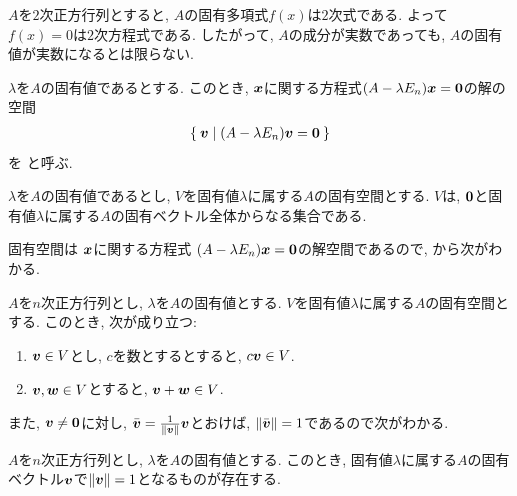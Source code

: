 \begin{remark}
  $A$を$2$次正方行列とすると, $A$の固有多項式$f(x)$は$2$次式である.
  よって$f(x)=0$は$2$次方程式である.
  したがって, $A$の成分が実数であっても,
  $A$の固有値が実数になるとは限らない.
\end{remark}

\begin{definition}
  $\lambda$を$A$の固有値であるとする.
  このとき,
  $\boldsymbol{x}$に関する方程式$(A-\lambda E_n)\boldsymbol{x}=\boldsymbol{0}$の解の空間
  \begin{align*}
    \Set{\boldsymbol{v}| (A-\lambda E_n)\boldsymbol{v}=\boldsymbol{0}}
  \end{align*}
  を
 と呼ぶ.
\end{definition}
\begin{remark}
  $\lambda$を$A$の固有値であるとし,
  $V$を固有値$\lambda$に属する$A$の固有空間とする.
  $V$は,
  $\boldsymbol{0}$と固有値$\lambda$に属する$A$の固有ベクトル全体からなる集合である.
\end{remark}
固有空間は
$\boldsymbol{x}$に関する方程式
$(A-\lambda E_n)\boldsymbol{x}=\boldsymbol{0}$の解空間であるので,
から次がわかる.
\begin{prop}
  $A$を$n$次正方行列とし,
  $\lambda$を$A$の固有値とする.
  $V$を固有値$\lambda$に属する$A$の固有空間とする.
  このとき, 次が成り立つ:
  \begin{enumerate}
  \item $\boldsymbol{v}\in V$とし, $c$を数とするとすると, $c\boldsymbol{v}\in V$.
  \item $\boldsymbol{v},\boldsymbol{w}\in V$とすると, $\boldsymbol{v}+\boldsymbol{w}\in V$.
  \end{enumerate}
\end{prop}
また, $\boldsymbol{v}\neq\boldsymbol{0}$に対し, $\bar{\boldsymbol{v}}=\frac{1}{\|\boldsymbol{v}\|}\boldsymbol{v}$とおけば,
$\|\bar{\boldsymbol{v}}\|=1$であるので次がわかる.
\begin{cor}
  $A$を$n$次正方行列とし,
  $\lambda$を$A$の固有値とする.
  このとき, 
  固有値$\lambda$に属する$A$の固有ベクトル$\boldsymbol{v}$で$\|\boldsymbol{v}\|=1$となるものが存在する.
\end{cor}

